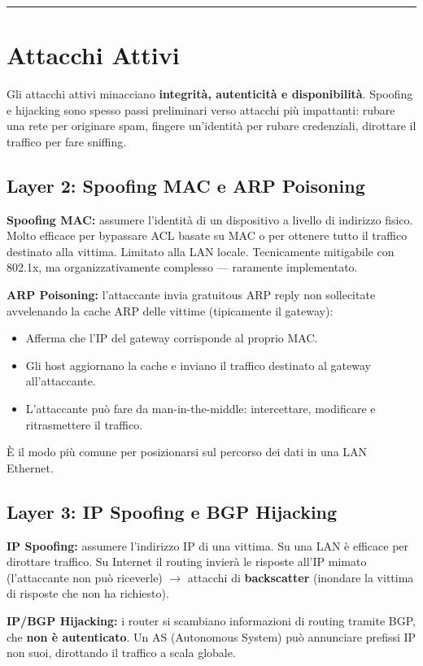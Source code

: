 \documentclass[12pt, a4paper]{report}
\begin{document}
\noindent\rule{\textwidth}{0.4pt}

\section{Attacchi Attivi}

Gli attacchi attivi minacciano \textbf{integrità, autenticità e disponibilità}. Spoofing e hijacking sono spesso passi preliminari verso attacchi più impattanti: rubare una rete per originare spam, fingere un'identità per rubare credenziali, dirottare il traffico per fare sniffing.

\subsection{Layer 2: Spoofing MAC e ARP Poisoning}
\textbf{Spoofing MAC:} assumere l'identità di un dispositivo a livello di indirizzo fisico. Molto efficace per bypassare ACL basate su MAC o per ottenere tutto il traffico destinato alla vittima. Limitato alla LAN locale. Tecnicamente mitigabile con 802.1x, ma organizzativamente complesso — raramente implementato.

\textbf{ARP Poisoning:} l'attaccante invia gratuitous ARP reply non sollecitate avvelenando la cache ARP delle vittime (tipicamente il gateway):
\begin{itemize}
	\item Afferma che l'IP del gateway corrisponde al proprio MAC.
	\item Gli host aggiornano la cache e inviano il traffico destinato al gateway all'attaccante.
	\item L'attaccante può fare da man-in-the-middle: intercettare, modificare e ritrasmettere il traffico.
\end{itemize}
È il modo più comune per posizionarsi sul percorso dei dati in una LAN Ethernet.

\subsection{Layer 3: IP Spoofing e BGP Hijacking}
\textbf{IP Spoofing:} assumere l'indirizzo IP di una vittima. Su una LAN è efficace per dirottare traffico. Su Internet il routing invierà le risposte all'IP mimato (l'attaccante non può riceverle) $\to$ attacchi di \textbf{backscatter} (inondare la vittima di risposte che non ha richiesto).

\textbf{IP/BGP Hijacking:} i router si scambiano informazioni di routing tramite BGP, che \textbf{non è autenticato}. Un AS (Autonomous System) può annunciare prefissi IP non suoi, dirottando il traffico a scala globale.
\end{document}

